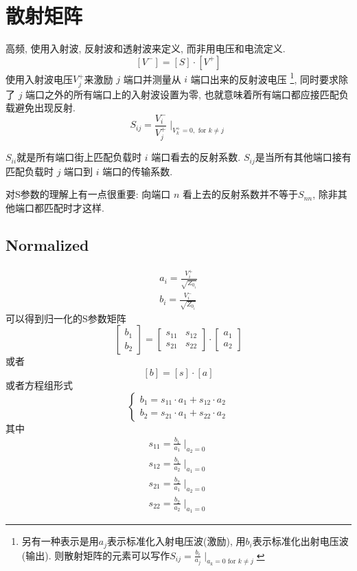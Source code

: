 \documentclass[a4paper]{report}
\begin{document}
\section{散射矩阵}
高频, 使用入射波, 反射波和透射波来定义, 而非用电压和电流定义. 
$$[V^-]=[S]\cdot [V^+]$$
使用入射波电压$V_j^+$来激励 $j$ 端口并测量从 $i$ 端口出来的反射波电压
\footnote{另有一种表示是用$a_j$表示标准化入射电压波(激励), 用$b_i$表示标准化出射电压波(输出). 则散射矩阵的元素可以写作$S_{ij}=\frac{b_i}{a_j}\mid_{a_k=0\text{ for }k\neq j}$}, 同时要求除了 $j$ 端口之外的所有端口上的入射波设置为零, 也就意味着所有端口都应接匹配负载避免出现反射. 
$$S_{ij}=\frac{V_i^-}{V_j^+}\mid_{V_k^+=0,\text{ for } k\neq j}$$

$S_{ii}$就是所有端口街上匹配负载时 $i$ 端口看去的反射系数. 
$S_{ij}$是当所有其他端口接有匹配负载时 $j$ 端口到 $i$ 端口的传输系数. 

对S参数的理解上有一点很重要: 向端口 $n$ 看上去的反射系数并不等于$S_{nn}$, 除非其他端口都匹配时才这样. 
\subsection{Normalized}
\begin{align*}
  a_i=\frac{V^+_i}{\sqrt{Z_{0_i}}}
  \\b_i=\frac{V^-_i}{\sqrt{Z_{0_i}}}
\end{align*}
可以得到归一化的S参数矩阵
\[
  \begin{bmatrix}
    b_1\\
    b_2
  \end{bmatrix}
  =
  \begin{bmatrix}
    s_{11}&s_{12}\\
    s_{21}&s_{22}
  \end{bmatrix}
  \cdot
  \begin{bmatrix}
    a_1\\
    a_2
  \end{bmatrix}
\]
或者
$$[b]=[s]\cdot [a]$$
或者方程组形式
$$
\begin{cases}
  b_1=s_{11}\cdot a_1+s_{12}\cdot a_{2}
  \\ b_2=s_{21}\cdot a_1+s_{22}\cdot a_{2}
\end{cases}
$$
其中
\begin{align*}
  s_{11}=\frac{b_1}{a_1}\mid_{a_2=0}
  \\  s_{12}=\frac{b_1}{a_2}\mid_{a_1=0}
  \\  s_{21}=\frac{b_2}{a_1}\mid_{a_2=0}
  \\  s_{22}=\frac{b_2}{a_2}\mid_{a_1=0}
\end{align*}
\end{document}
